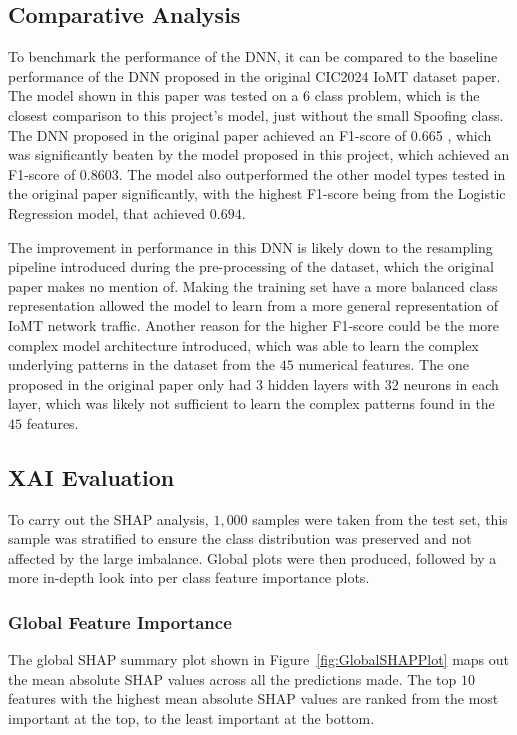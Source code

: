 \documentclass[11pt,a4paper]{article}
\begin{document}
\subsection{Comparative Analysis}
To benchmark the performance of the DNN, it can be compared to the baseline performance of the DNN proposed in the original CIC2024 IoMT dataset paper. The model shown in this paper was tested on a 6 class problem, which is the closest comparison to this project’s model, just without the small Spoofing class. The DNN proposed in the original paper achieved an F1-score of 0.665 \cite{dadkhah2024ciciomt2024}, which was significantly beaten by the model proposed in this project, which achieved an F1-score of $0.8603$. The model also outperformed the other model types tested in the original paper significantly, with the highest F1-score being from the Logistic Regression model, that achieved $0.694$.

The improvement in performance in this DNN is likely down to the resampling pipeline introduced during the pre-processing of the dataset, which the original paper makes no mention of. Making the training set have a more balanced class representation allowed the model to learn from a more general representation of IoMT network traffic. Another reason for the higher F1-score could be the more complex model architecture introduced, which was able to learn the complex underlying patterns in the dataset from the $45$ numerical features. The one proposed in the original paper only had $3$ hidden layers with $32$ neurons in each layer, which was likely not sufficient to learn the complex patterns found in the $45$ features.

\subsection{XAI Evaluation}
To carry out the SHAP analysis, $1,000$ samples were taken from the test set, this sample was stratified to ensure the class distribution was preserved and not affected by the large imbalance. Global plots were then produced, followed by a more in-depth look into per class feature importance plots.

\subsubsection{Global Feature Importance}
The global SHAP summary plot shown in Figure~\ref{fig:GlobalSHAPPlot} maps out the mean absolute SHAP values across all the predictions made. The top $10$ features with the highest mean absolute SHAP values are ranked from the most important at the top, to the least important at the bottom.
\end{document}
